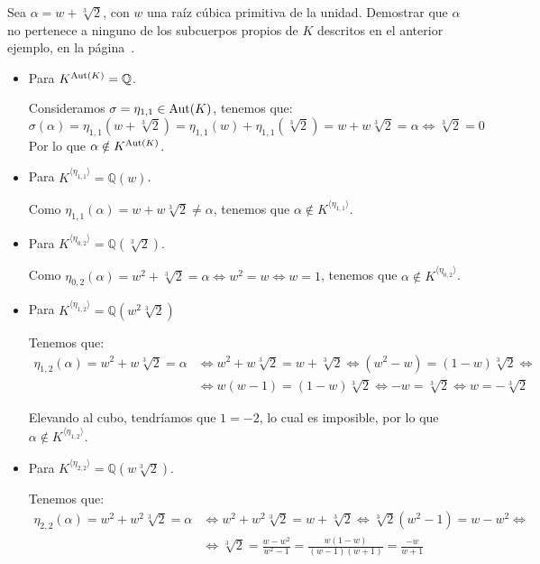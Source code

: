\begin{ejercicio}
    Sea $\alpha=w+\sqrt[3]{2}$, con $w$ una raíz cúbica primitiva de la unidad. Demostrar que $\alpha$ no pertenece a ninguno de los subcuerpos propios de $K$ descritos en el anterior ejemplo, en la página~\pageref{ejemplo:subcuerpos_fijos}.
    \begin{itemize}
        \item Para $K^{\operatorname{Aut}(K)} = \mathbb{Q}$.
        
        Consideramos $\sigma=\eta_{1,1}\in \operatorname{Aut}(K)$, tenemos que:
        \begin{equation*}
            \sigma(\alpha) = \eta_{1,1}(w+\sqrt[3]{2}) = \eta_{1,1}(w) + \eta_{1,1}(\sqrt[3]{2}) = w + w\sqrt[3]{2} =\alpha \iff \sqrt[3]{2} = 0
        \end{equation*}
        Por lo que $\alpha\notin K^{\operatorname{Aut}(K)}$.
        \item Para $K^{\langle \eta_{1,1} \rangle } = \mathbb{Q}(w)$.
        
        Como $\eta_{1,1}(\alpha) = w + w\sqrt[3]{2} \neq \alpha$, tenemos que $\alpha\notin K^{\langle \eta_{1,1} \rangle }$.
        \item Para $K^{\langle \eta_{0,2} \rangle } = \mathbb{Q}(\sqrt[3]{2})$.
        
        Como $\eta_{0,2}(\alpha) = w^2 + \sqrt[3]{2} = \alpha \iff w^2 = w\iff w=1$, tenemos que $\alpha\notin K^{\langle \eta_{0,2} \rangle }$.
        \item Para $K^{\langle \eta_{1,2} \rangle } = \mathbb{Q}(w^2\sqrt[3]{2})$

        Tenemos que:
        \begin{align*}
            \eta_{1,2}(\alpha) = w^2 + w\sqrt[3]{2} = \alpha &\iff w^2 + w\sqrt[3]{2} = w + \sqrt[3]{2} \iff (w^2-w) = (1-w)\sqrt[3]{2} \iff\\&\iff w(w-1) = (1-w)\sqrt[3]{2} \iff -w = \sqrt[3]{2} \iff w = -\sqrt[3]{2}
        \end{align*}

        Elevando al cubo, tendríamos que $1 = -2$, lo cual es imposible, por lo que $\alpha\notin K^{\langle \eta_{1,2} \rangle }$.
        \item Para $K^{\langle \eta_{2,2} \rangle } = \mathbb{Q}(w\sqrt[3]{2})$.
        
        Tenemos que:
        \begin{align*}
            \eta_{2,2}(\alpha) = w^2 + w^2\sqrt[3]{2} = \alpha &\iff w^2 + w^2\sqrt[3]{2} = w + \sqrt[3]{2} \iff \sqrt[3]{2}(w^2-1) = w-w^2 \iff\\&\iff \sqrt[3]{2} = \frac{w-w^2}{w^2-1} = \frac{w(1-w)}{(w-1)(w+1)} = \frac{-w}{w+1}
        \end{align*}


\end{itemize}
\end{ejercicio}
